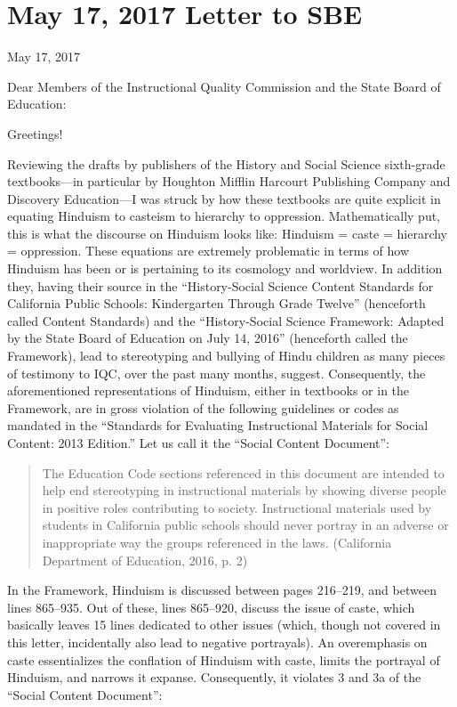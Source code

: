\chapter{May 17, 2017 Letter to SBE}

May 17, 2017
\vskip 2pt

Dear Members of the Instructional Quality Commission and the State Board of Education:
\vskip 2pt

Greetings!
\vskip 2pt

Reviewing the drafts by publishers of the History and Social Science sixth-grade textbooks—in particular by Houghton Mifflin Harcourt Publishing Company and Discovery Education—I was struck by how these textbooks are quite explicit in equating Hinduism to casteism to hierarchy to oppression. Mathematically put, this is what the discourse on Hinduism looks like: Hinduism = caste = hierarchy = oppression. These equations are extremely problematic in terms of how Hinduism has been or is pertaining to its cosmology and worldview. In addition they, having their source in the “History-Social Science Content Standards for California Public Schools: Kindergarten Through Grade Twelve” (henceforth called Content Standards) and the “History-Social Science Framework: Adapted by the State Board of Education on July 14, 2016” (henceforth called the Framework), lead to stereotyping and bullying of Hindu children as many pieces of testimony to IQC, over the past many months, suggest. Consequently, the aforementioned representations of Hinduism, either in textbooks or in the Framework, are in gross violation of the following guidelines or codes as mandated in the “Standards for Evaluating Instructional Materials for Social Content: 2013 Edition.” Let us call it the “Social Content Document”: 
\begin{quote}
The Education Code sections referenced in this document are intended to help end stereotyping in instructional materials by showing diverse people in positive roles contributing to society. Instructional materials used by students in California public schools should never portray in an adverse or inappropriate way the groups referenced in the laws. (California Department of Education, 2016, p. 2)
\end{quote}
In the Framework, Hinduism is discussed between pages 216--219, and between lines 865--935. Out of these, lines 865--920, discuss the issue of caste, which basically leaves 15 lines dedicated to other issues (which, though not covered in this letter, incidentally also lead to negative portrayals). An overemphasis on caste essentializes the conflation of Hinduism with caste, limits the portrayal of Hinduism, and narrows it expanse. Consequently, it violates 3 and 3a of the “Social Content Document”:

